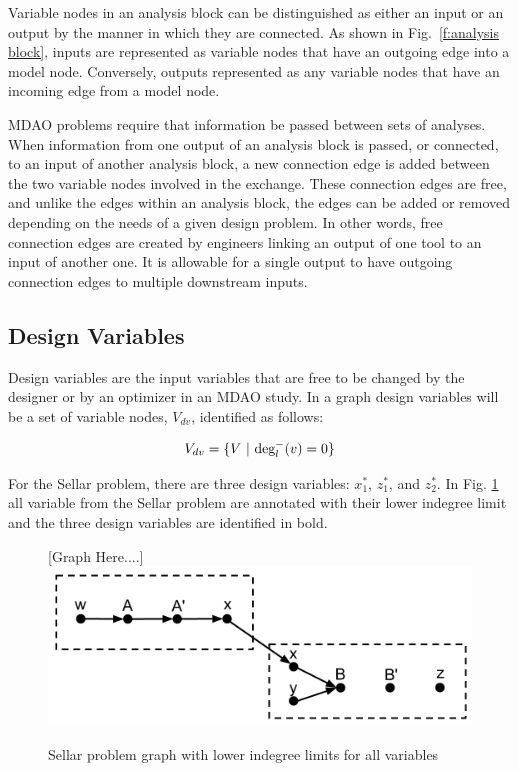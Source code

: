 Variable nodes in an analysis block can be distinguished as either an input or 
an output by the manner in which they are connected. As shown in Fig.~\ref{f:analysis block}, 
inputs are represented as variable nodes that have an outgoing edge into a model 
node. Conversely, outputs represented as any variable nodes that have an incoming 
edge from a model node. 

MDAO problems require that information be passed between sets of analyses. When 
information from one output of an analysis block is passed, or connected, to an 
input of another analysis block, a new connection edge is added between the two 
variable nodes involved in the exchange. These connection edges are free, and unlike the edges 
within an analysis block, the edges can be added or removed depending on the needs
of a given design problem. In other words, free connection edges are created by 
engineers linking an output of one tool to an input of another one. It is 
allowable for a single output to have outgoing connection edges to multiple 
downstream inputs. 

\subsection{Design Variables}
Design variables are the input variables that are free to be 
changed by the designer or by an optimizer in an MDAO study. In a graph design
variables will be a set of variable nodes, $V_{dv}$, identified as follows: 

\begin{equation}
  V_{dv} = \{V \ | \  \textrm{deg}_l^-(v)=0\}
\end{equation}

For the Sellar problem, there are three design variables: $x_1^*$, $z_1^*$, and 
$z_2^*$. In Fig. \ref{f:designvars} all variable from the Sellar problem are 
annotated with their lower indegree limit and the three design variables are identified 
in bold. 

\begin{figure}[htb!]
  \begin{center}
    [Graph Here....]
    \includegraphics[width=.6\textwidth]{images/design_vars_graph}
  \end{center}
  \caption{Sellar problem graph with lower indegree limits for all variables \label{f:designvars}}
\end{figure}

